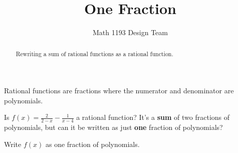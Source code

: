 \documentclass[noauthor]{ximera}
\title{One Fraction}
\author{Math 1193 Design Team}
\begin{document}
\begin{abstract}
    Rewriting a sum of rational functions as a rational function.
\end{abstract}
\maketitle

Rational functions are fractions where the numerator and
denominator are polynomials.

Is \(f(x) = \frac{2}{2 - x} - \frac{1}{x - 4}\) a rational function?
It's a \textbf{sum} of two fractions of polynomials, but can it be
written as just \textbf{one} fraction of polynomials?

Write \(f(x)\) as one fraction of polynomials.
\end{document}
